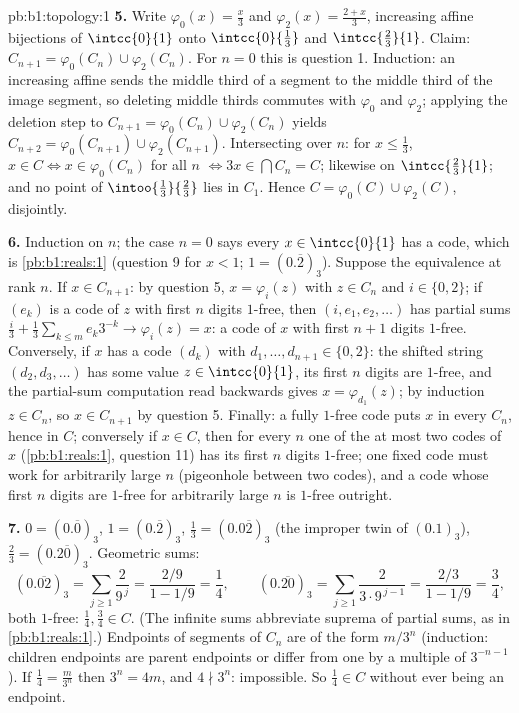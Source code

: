 \begin{solution}{pb:b1:topology:1}
\textbf{5.} Write $\varphi_0(x) = \frac x3$ and $\varphi_2(x) =
\frac{2 + x}{3}$, increasing affine bijections of $\intcc{0}{1}$
onto $\intcc{0}{\frac13}$ and $\intcc{\frac23}{1}$. Claim:
$C_{n+1} = \varphi_0(C_n) \cup \varphi_2(C_n)$. For $n = 0$ this
is question 1. Induction: an increasing affine  sends the
middle third of a segment to the middle third of the image
segment, so deleting middle thirds commutes with $\varphi_0$ and
$\varphi_2$; applying the deletion step to $C_{n+1} =
\varphi_0(C_n) \cup \varphi_2(C_n)$ yields $C_{n+2} =
\varphi_0(C_{n+1}) \cup \varphi_2(C_{n+1})$. Intersecting over
$n$: for $x \leq \frac13$, $x \in C \iff x \in \varphi_0(C_n)$
for all $n$ $\iff 3x \in \bigcap C_n = C$; likewise on
$\intcc{\frac23}{1}$; and no point of $\intoo{\frac13}{\frac23}$
lies in $C_1$. Hence $C = \varphi_0(C) \cup \varphi_2(C)$,
disjointly.

\textbf{6.} Induction on $n$; the case $n = 0$ says every $x \in
\intcc{0}{1}$ has a code, which is \cref{pb:b1:reals:1}
(question 9 for $x < 1$; $1 = (0.\overline 2)_3$). Suppose the
equivalence at rank $n$. If $x \in C_{n+1}$: by question 5, $x =
\varphi_i(z)$ with $z \in C_n$ and $i \in \{0, 2\}$; if $(e_k)$
is a code of $z$ with first $n$ digits $1$-free, then $(i, e_1,
e_2, \dots)$ has partial sums $\frac i3 + \frac13\sum_{k\leq m}
e_k 3^{-k} \to \varphi_i(z) = x$: a code of $x$ with first $n +
1$ digits $1$-free. Conversely, if $x$ has a code $(d_k)$ with
$d_1, \dots, d_{n+1} \in \{0, 2\}$: the shifted string $(d_2,
d_3, \dots)$ has some value $z \in \intcc{0}{1}$, its first $n$
digits are $1$-free, and the partial-sum computation read
backwards gives $x = \varphi_{d_1}(z)$; by induction $z \in
C_n$, so $x \in C_{n+1}$ by question 5. Finally: a fully
$1$-free code puts $x$ in every $C_n$, hence in $C$; conversely
if $x \in C$, then for every $n$ one of the at most two codes of
$x$ (\cref{pb:b1:reals:1}, question 11) has its first $n$ digits
$1$-free; one fixed code must work for arbitrarily large $n$
(pigeonhole between two codes), and a code whose first $n$
digits are $1$-free for arbitrarily large $n$ is $1$-free
outright.

\textbf{7.} $0 = (0.\overline 0)_3$, $1 = (0.\overline 2)_3$,
$\frac13 = (0.0\overline{2})_3$ (the improper twin of $(0.1)_3$),
$\frac23 = (0.2\overline{0})_3$. Geometric sums:
\[
(0.\overline{02})_3 = \sum_{j\geq1} \frac{2}{9^{\,j}}
= \frac{2/9}{1 - 1/9} = \frac14 ,
\qquad
(0.\overline{20})_3 = \sum_{j\geq1} \frac{2}{3\cdot 9^{\,j-1}}
= \frac{2/3}{1 - 1/9} = \frac34 ,
\]
both $1$-free: $\frac14, \frac34 \in C$. (The infinite sums
abbreviate suprema of partial sums, as in \cref{pb:b1:reals:1}.)
Endpoints of segments of $C_n$ are of the form $m/3^n$
(induction: children endpoints are parent endpoints or differ
from one by a multiple of $3^{-n-1}$). If $\frac14 =
\frac{m}{3^n}$ then $3^n = 4m$, and $4 \nmid 3^n$: impossible.
So $\frac14 \in C$ without ever being an endpoint.


\end{solution}
